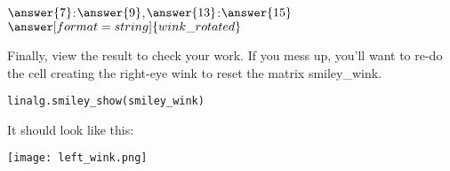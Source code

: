 \documentclass{ximera}
\begin{document}
\begin{problem}
\begin{enumerate}
$\answer{7}$:$\answer{9}$,$\answer{13}$:$\answer{15}$\mtlb{)=}$\answer[format=string]{wink\_rotated}$\mtlb{;}

Finally, view the result to check your work. If you mess up, you'll want to re-do the cell creating the right-eye wink to reset the matrix smiley\_wink.
\begin{verbatim}
linalg.smiley_show(smiley_wink)
\end{verbatim}

It should look like this:
\begin{center}
\texttt{[image: left\_wink.png]}
\end{center}

\end{enumerate}

\end{problem}
\end{document}
